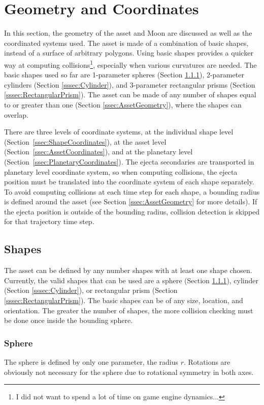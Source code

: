 \documentclass{article}
\begin{document}
\section{Geometry and Coordinates}

In this section, the geometry of the asset and Moon are discussed as well as the coordinated systems used. The asset is made of a combination of basic shapes, instead of a surface of arbitrary polygons. Using basic shapes provides a quicker way at computing collisions\footnote{I did not want to spend a lot of time on game engine dynamics...}, especially when various curvatures are needed. The basic shapes used so far are 1-parameter spheres (Section \ref{sssec:Sphere}), 2-parameter cylinders (Section \ref{sssec:Cylinder}), and 3-parameter rectangular prisms (Section \ref{sssec:RectangularPrism}). The asset can be made of any number of shapes equal to or greater than one (Section \ref{ssec:AssetGeometry}), where the shapes can overlap.

There are three levels of coordinate systems, at the individual shape level (Section~\ref{ssec:ShapeCoordinates}), at the asset level (Section~\ref{ssec:AssetCoordinates}), and at the planetary level (Section~\ref{ssec:PlanetaryCoordinates}). The ejecta secondaries are transported in planetary level coordinate system, so when computing collisions, the ejecta position must be translated into the coordinate system of each shape separately. To avoid computing collisions at each time step for each shape, a bounding radius is defined around the asset (see Section \ref{ssec:AssetGeometry} for more details). If the ejecta position is outside of the bounding radius, collision detection is skipped for that trajectory time step.

\subsection{Shapes}
The asset can be defined by any number shapes with at least one shape chosen. Currently, the valid shapes that can be used are a sphere (Section \ref{sssec:Sphere}), cylinder (Section \ref{sssec:Cylinder}), or rectangular prism (Section \ref{sssec:RectangularPrism}). The basic shapes can be of any size, location, and orientation. The greater the number of shapes, the more collision checking must be done once inside the bounding sphere.



\subsubsection{Sphere}
\label{sssec:Sphere}
The sphere is defined by only one parameter, the radius $r$. Rotations are obviously not necessary for the sphere due to rotational symmetry in both axes.
\end{document}
